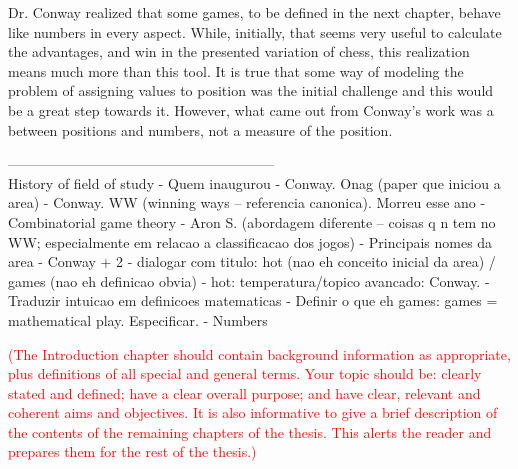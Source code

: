Dr. Conway realized that some games, to be defined in the next chapter, behave like numbers in every aspect. While, initially, that seems very useful to calculate the advantages, and win in the presented variation of chess, this realization means much more than this tool. It is true that some way of modeling the problem of assigning values to position was the initial challenge and this would be a great step towards it. However, what came out from Conway's work was a  between positions and numbers, not a measure of the position.




---------------------------------------------------------\\
History of field of study
- Quem inaugurou
-  Conway. Onag (paper que iniciou a area)
- Conway. WW (winning ways – referencia canonica). Morreu esse ano
- Combinatorial game theory
- Aron S. (abordagem diferente – coisas q n  tem no WW; especialmente em relacao a classificacao dos jogos)
- Principais nomes da area
- Conway + 2 
- dialogar com titulo: hot (nao eh conceito inicial da area) / games (nao eh definicao obvia)
- hot: temperatura/topico avancado: Conway.
- Traduzir intuicao em definicoes matematicas
- Definir o que eh games: games = mathematical play. Especificar.
- Numbers

\textcolor{red}{(The Introduction chapter should contain background information as appropriate, plus definitions of all special and general terms. Your topic should be: clearly stated and defined; have a clear overall purpose; and have clear, relevant and coherent aims and objectives. It is also informative to give a brief description of the contents of the remaining chapters of the thesis. This alerts the reader and prepares them for the rest of the thesis.)}


